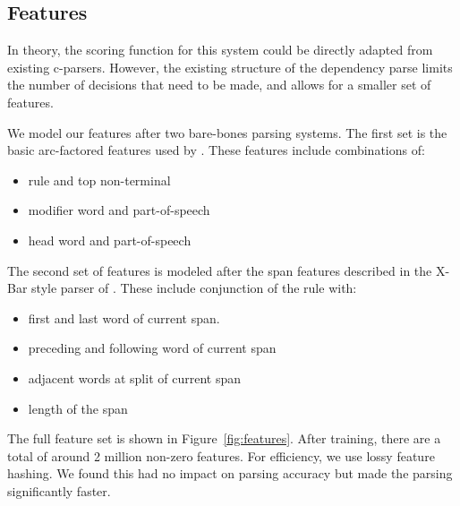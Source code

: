 \documentclass[11pt,letterpaper]{article}
\begin{document}
\subsection{Features}

In theory, the scoring function for this system could be directly
adapted from existing c-parsers. However, the existing structure of
the dependency parse limits the number of decisions that need to be
made, and allows for a smaller set of features.

We model our features after two bare-bones parsing systems. 
The first set is the basic arc-factored features 
used by . These features include combinations of:

\begin{itemize}
\item rule and top non-terminal
\item modifier word and part-of-speech
\item head word and part-of-speech
\end{itemize}


The second set of features is modeled after the span features
described in the X-Bar style parser of . These
include conjunction of the rule with:

\begin{itemize}
\item first and last word of current span.
\item preceding and following word of current span
\item adjacent words at split of current span
\item length of the span
\end{itemize}

The full feature set is shown in Figure~\ref{fig:features}.  After
training, there are a total of around 2 million non-zero features.
For efficiency, we use lossy feature hashing. We found this had no
impact on parsing accuracy but made the parsing significantly faster.
\end{document}
